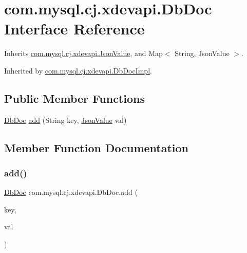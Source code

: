 \hypertarget{interfacecom_1_1mysql_1_1cj_1_1xdevapi_1_1_db_doc}{}\section{com.\+mysql.\+cj.\+xdevapi.\+Db\+Doc Interface Reference}
\label{interfacecom_1_1mysql_1_1cj_1_1xdevapi_1_1_db_doc}


Inherits \mbox{\hyperlink{interfacecom_1_1mysql_1_1cj_1_1xdevapi_1_1_json_value}{com.\+mysql.\+cj.\+xdevapi.\+Json\+Value}}, and Map$<$ String, Json\+Value $>$.



Inherited by \mbox{\hyperlink{classcom_1_1mysql_1_1cj_1_1xdevapi_1_1_db_doc_impl}{com.\+mysql.\+cj.\+xdevapi.\+Db\+Doc\+Impl}}.

\subsection*{Public Member Functions}
\begin{DoxyCompactItemize}
\item 
\mbox{\hyperlink{interfacecom_1_1mysql_1_1cj_1_1xdevapi_1_1_db_doc}{Db\+Doc}} \mbox{\hyperlink{interfacecom_1_1mysql_1_1cj_1_1xdevapi_1_1_db_doc_a49318fdc8c741c373d2cae74292bb29d}{add}} (String key, \mbox{\hyperlink{interfacecom_1_1mysql_1_1cj_1_1xdevapi_1_1_json_value}{Json\+Value}} val)
\end{DoxyCompactItemize}


\subsection{Member Function Documentation}
\mbox{\label{interfacecom_1_1mysql_1_1cj_1_1xdevapi_1_1_db_doc_a49318fdc8c741c373d2cae74292bb29d}} 
\subsubsection{\texorpdfstring{add()}{add()}}
{\footnotesize\ttfamily \mbox{\hyperlink{interfacecom_1_1mysql_1_1cj_1_1xdevapi_1_1_db_doc}{Db\+Doc}} com.\+mysql.\+cj.\+xdevapi.\+Db\+Doc.\+add (\begin{DoxyParamCaption}\item[{String}]{key,  }\item[{\mbox{\hyperlink{interfacecom_1_1mysql_1_1cj_1_1xdevapi_1_1_json_value}{Json\+Value}}}]{val }\end{DoxyParamCaption})}



